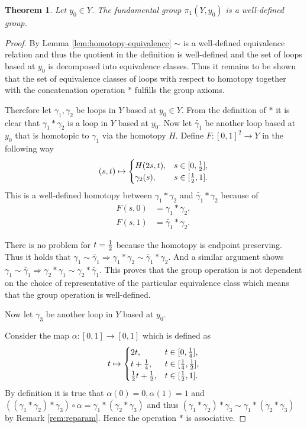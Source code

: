\documentclass[a4paper, 11pt, twoside]{article}
\theoremstyle{break}
\newtheorem{thm}{Theorem}[section]
\theoremstyle{break}
\begin{document}
\begin{thm}
  Let $y_0 \in Y$. The fundamental group $\pi_1(Y, y_0)$ is a well-defined group. 
\end{thm}

\begin{proof}
  By Lemma \ref{lem:homotopy-equivalence} $\sim$ is a well-defined equivalence relation and thus the quotient in the definition is well-defined and the set of loops based at $y_0$ is decomposed into equivalence classes.
  Thus it remains to be shown that the set of equivalence classes of loops with respect to homotopy together with the concatenation operation $*$ fulfills the group axioms.

  Therefore let $\gamma_1, \gamma_2$ be loops in $Y$ based at $y_0 \in Y$. From the definition of $*$ it is clear that $\gamma_1 * \gamma_2$ is a loop in $Y$ based at $y_0$.
  Now let $\tilde{\gamma_1}$ be another loop based at $y_0$ that is homotopic to $\gamma_1$ via the homotopy $H$. Define $F\colon [0,1]^2 \to Y$ in the following way
  \begin{equation*}
    (s, t) \mapsto \begin{cases}
      H(2s, t), &s \in [0,{1 \over 2}], \\
      \gamma_2(s), &s \in [{1 \over 2}, 1].
    \end{cases}
  \end{equation*}
  This is a well-defined homotopy between $\gamma_1 * \gamma_2$ and $\tilde{\gamma_1} * \gamma_2$ because of
  \begin{align*}
    F(s, 0) &= \gamma_1 * \gamma_2, \\
    F(s, 1) &= \tilde{\gamma_1} * \gamma_2.
  \end{align*}
  
  There is no problem for $t = {1 \over 2}$ because the homotopy is endpoint preserving. Thus it holds that $\gamma_1 \sim \tilde{\gamma_1} \Rightarrow \gamma_1 * \gamma_2 \sim \tilde{\gamma_1} * \gamma_2$.
  And a similar argument shows $\gamma_1 \sim \tilde{\gamma_1} \Rightarrow \gamma_2 * \gamma_1 \sim  \gamma_2 * \tilde{\gamma_1}$. 
  This proves that the group operation is not dependent on the choice of representative of the particular equivalence class which means that the group operation is well-defined.

  Now let $\gamma_3$ be another loop in $Y$ based at $y_0$. 

  Consider the map $\alpha\colon [0,1] \to [0,1]$ which is defined as
  \begin{equation*}
    t \mapsto \begin{cases}
      2t, &t \in [0, {1 \over 4}], \\
      t + {1 \over 4}, &t \in [{1\over4}, {1\over2}], \\
      {1\over2}t + {1\over2}, &t\in[{1\over2}, 1].
    \end{cases}
  \end{equation*}
  By definition it is true that $\alpha(0) = 0, \alpha(1) = 1$ and $((\gamma_1 * \gamma_2) * \gamma_3) \circ \alpha = \gamma_1 * (\gamma_2 * \gamma_3)$ and thus $(\gamma_1 * \gamma_2) * \gamma_3 \sim \gamma_1 * (\gamma_2 * \gamma_3)$ by Remark \ref{rem:reparam}.
  Hence the operation $*$ is associative.
  

\end{proof}
\end{document}
